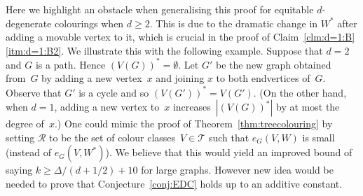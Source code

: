 \documentclass[11pt]{article}
\theoremstyle{plain}
\numberwithin{equation}{section}
\begin{document}
Here we highlight an obstacle when generalising this proof for equitable $d$-degenerate colourings when $d \ge 2$.
This is due to the dramatic change in $W^*$ after adding a movable vertex to it, which is crucial in the proof of Claim~\ref{clm:d=1:B}\ref{itm:d=1:B2}.
We illustrate this with the following example.
Suppose that $d=2$ and $G$ is a path.
Hence $(V(G))^* = \emptyset$.
Let $G'$ be the new graph obtained from~$G$ by adding a new vertex~$x$ and joining $x$ to both endvertices of~$G$.
Observe that $G'$ is a cycle and so $(V(G'))^* = V(G')$.
(On the other hand, when $d =1$, adding a new vertex to~$x$ increases~$|(V(G))^*|$ by at most the degree of~$x$.)
One could mimic the proof of Theorem~\ref{thm:treecolouring} by setting $\mathcal{R}$ to be the set of colour classes~$V \in \mathcal{T}$ such that $e_G(V,W)$ is small (instead of $e_G(V,W^*)$).
We believe that this would yield an improved bound of saying $k \ge \Delta/(d + 1/2) +10$ for large graphs.
However new idea would be needed to prove that Conjecture~\ref{conj:EDC} holds up to an additive constant.

	
	
	
	
	
\end{document}
